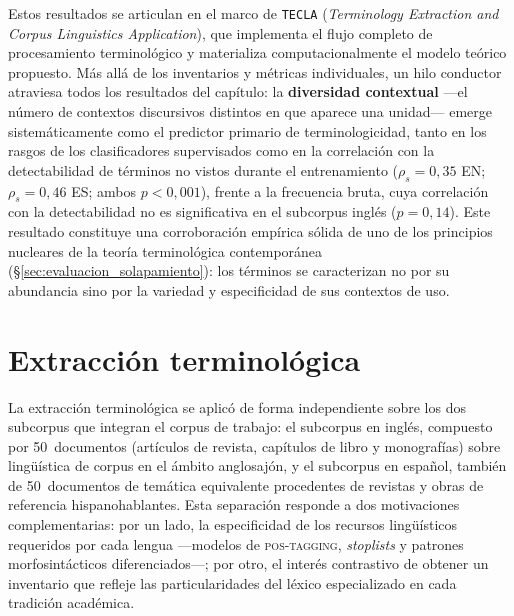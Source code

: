 Estos resultados se articulan en el marco de \texttt{TECLA} (\textit{Terminology Extraction and Corpus Linguistics Application}), que implementa el flujo completo de procesamiento terminológico y materializa computacionalmente el modelo teórico propuesto. Más allá de los inventarios y métricas individuales, un hilo conductor atraviesa todos los resultados del capítulo: la \textbf{diversidad contextual} ---el número de contextos discursivos distintos en que aparece una unidad--- emerge sistemáticamente como el predictor primario de terminologicidad, tanto en los rasgos de los clasificadores supervisados como en la correlación con la detectabilidad de términos no vistos durante el entrenamiento ($\rho_s = 0{,}35$ EN; $\rho_s = 0{,}46$ ES; ambos $p < 0{,}001$), frente a la frecuencia bruta, cuya correlación con la detectabilidad no es significativa en el subcorpus inglés ($p = 0{,}14$). Este resultado constituye una corroboración empírica sólida de uno de los principios nucleares de la teoría terminológica contemporánea (§\ref{sec:evaluacion_solapamiento}): los términos se caracterizan no por su abundancia sino por la variedad y especificidad de sus contextos de uso.
{}
\fontsize{12}{14}\selectfont


\section{Extracción terminológica}
\label{sec:extraccion}

La extracción terminológica se aplicó de forma independiente sobre los dos
subcorpus que integran el corpus de trabajo: el subcorpus en inglés, compuesto
por 50~documentos (artículos de revista, capítulos de libro y monografías)
sobre lingüística de corpus en el ámbito anglosajón, y el subcorpus en
español, también de 50~documentos de temática equivalente procedentes de
revistas y obras de referencia hispanohablantes. Esta separación responde a
dos motivaciones complementarias: por un lado, la especificidad de los
recursos lingüísticos requeridos por cada lengua ---modelos de
\textsc{pos-tagging}, \textit{stoplists} y patrones morfosintácticos
diferenciados---; por otro, el interés contrastivo de obtener un inventario
que refleje las particularidades del léxico especializado en cada tradición
académica.


